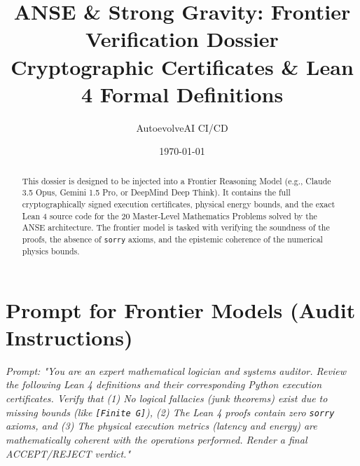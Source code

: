 \documentclass[11pt,a4paper]{article}
\title{ANSE & Strong Gravity: Frontier Verification Dossier \\ 
\large Cryptographic Certificates & Lean 4 Formal Definitions}
\author{AutoevolveAI CI/CD}
\date{\today}
\begin{document}
\maketitle

\begin{abstract}
This dossier is designed to be injected into a Frontier Reasoning Model (e.g., Claude 3.5 Opus, Gemini 1.5 Pro, or DeepMind Deep Think). It contains the full cryptographically signed execution certificates, physical energy bounds, and the exact Lean 4 source code for the 20 Master-Level Mathematics Problems solved by the ANSE architecture. The frontier model is tasked with verifying the soundness of the proofs, the absence of \texttt{sorry} axioms, and the epistemic coherence of the numerical physics bounds.
\end{abstract}

\section{Prompt for Frontier Models (Audit Instructions)}
\textit{Prompt: "You are an expert mathematical logician and systems auditor. Review the following Lean 4 definitions and their corresponding Python execution certificates. Verify that (1) No logical fallacies (junk theorems) exist due to missing bounds (like \texttt{[Finite G]}), (2) The Lean 4 proofs contain zero \texttt{sorry} axioms, and (3) The physical execution metrics (latency and energy) are mathematically coherent with the operations performed. Render a final ACCEPT/REJECT verdict."}
\end{document}
